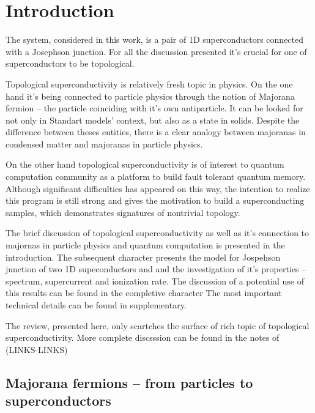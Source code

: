 \chapter{Introduction}


The system, considered in this work, is a pair of 1D superconductors connected with a Josephson junction. For all the discussion presented it's crucial for one of superconductors to be topological. 

Topological superconductivity is relatively fresh topic in physics. On the one hand it's being connected to particle physics through the notion of Majorana fermion -- the particle coinciding with it's own antiparticle. It can be looked for not only in Standart models' context, but also as a state in solids. Despite the difference between theses entities, there is a clear analogy between majoranas in condensed matter and majoranas in particle physics.

 On the other hand topological superconductivity is of interest to quantum computation community as a platform to build fault tolerant quantum memory. Although significant difficulties has appeared on this way, the intention to realize this program is still strong and gives the motivation to build a superconducting samples, which demonstrates signatures of nontrivial topology.

The brief discussion of topological superconductivity as well as it's connection to majornas in particle physics and quantum computation is presented in the introduction. The subsequent character presents the model for Jospehson junction of two 1D supeconductors  and and the investigation of it's properties -- spectrum, supercurrent and ionization rate. The discussion of a potential use of this results can be found in the	completive character The most important technical details can be found in supplementary.

The review, presented here, only scartches the surface of rich topic of topological superconductivity. More complete discsssion can be found in the notes of (LINKS-LINKS)


\iffalse
\section{Majorana fermions -- from particles to superconductors}

